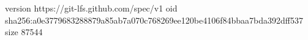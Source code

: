 version https://git-lfs.github.com/spec/v1
oid sha256:a0e3779683288879a85ab7a070c768269ee120be4106f84bbaa7bda392dff537
size 87544
